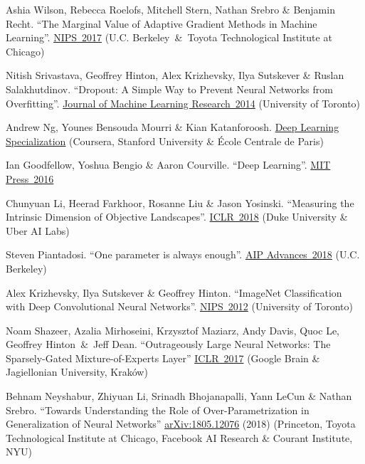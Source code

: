 \documentclass{article}
\begin{document}
\begin{thebibliography}{10}
 Ashia Wilson, Rebecca Roelofs, Mitchell Stern, Nathan Srebro \& Benjamin Recht. ``The Marginal Value of Adaptive Gradient Methods in Machine Learning''. \href{https://papers.nips.cc/paper/7003-the-marginal-value-of-adaptive-gradient-methods-in-machine-learning.pdf}{NIPS~2017} (U.C. Berkeley~\&~Toyota Technological Institute at Chicago)

 Nitish Srivastava, Geoffrey Hinton, Alex Krizhevsky, Ilya Sutskever \& Ruslan Salakhutdinov. ``Dropout: A Simple Way to Prevent Neural Networks from Overfitting''. \href{http://jmlr.org/papers/volume15/srivastava14a.old/srivastava14a.pdf}{Journal of Machine Learning Research~2014} (University of Toronto) 

 Andrew Ng, Younes Bensouda Mourri \& Kian Katanforoosh. \href{https://www.coursera.org/specializations/deep-learning}{Deep Learning Specialization} (Coursera, Stanford University \& \'Ecole Centrale de Paris)

 Ian Goodfellow, Yoshua Bengio \& Aaron Courville. ``Deep Learning''. \href{http://www.deeplearningbook.org}{MIT Press~2016}

 Chunyuan Li, Heerad Farkhoor, Rosanne Liu \& Jason Yosinski. ``Measuring the Intrinsic Dimension of Objective Landscapes''. \href{https://openreview.net/pdf?id=ryup8-WCW}{ICLR~2018} (Duke University \& Uber AI Labs)

 Steven Piantadosi. ``One parameter is always enough''. \href{https://aip.scitation.org/doi/pdf/10.1063/1.5031956?class=pdf}{AIP Advances~2018} (U.C. Berkeley)

 Alex Krizhevsky, Ilya Sutskever \& Geoffrey Hinton. ``ImageNet Classification with Deep Convolutional Neural Networks''. \href{https://papers.nips.cc/paper/4824-imagenet-classification-with-deep-convolutional-neural-networks.pdf}{NIPS~2012} (University of Toronto)

 Noam Shazeer, Azalia Mirhoseini, Krzysztof Maziarz, Andy Davis, Quoc Le, Geoffrey Hinton~\&~Jeff Dean. ``Outrageously Large Neural Networks: The Sparsely-Gated Mixture-of-Experts Layer'' \href{https://openreview.net/pdf?id=B1ckMDqlg}{ICLR~2017} (Google Brain \& Jagiellonian University, Krak\'ow)

 Behnam Neyshabur, Zhiyuan Li, Srinadh Bhojanapalli, Yann LeCun \& Nathan Srebro. ``Towards Understanding the Role of Over-Parametrization in Generalization of Neural Networks'' \href{https://arxiv.org/pdf/1805.12076.pdf}{arXiv:1805.12076} (2018) (Princeton, Toyota Technological Institute at Chicago, Facebook AI Research \& Courant Institute, NYU)


\end{thebibliography}
\end{document}
